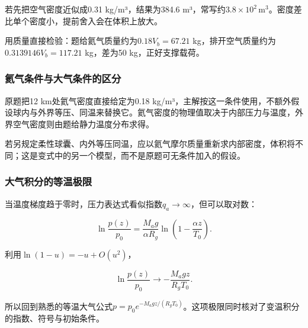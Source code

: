 \documentclass[12pt,a4paper,fontset=fandol]{ctexart}
\begin{document}
若先把空气密度近似成0.31 kg/m³，结果为384.6
m³，常写约\(3.8\times10^2\,\mathrm{m^3}\)。密度差比单个密度小，提前舍入会在体积上放大。

用质量直接检验：题给氦气质量约为\(0.18V_b=67.21\)
kg，排开空气质量约为\(0.3139146V_b=117.21\) kg，差为50
kg，正好支撑载荷。

\subsubsection{氦气条件与大气条件的区分}\label{ux6c26ux6c14ux6761ux4ef6ux4e0eux5927ux6c14ux6761ux4ef6ux7684ux533aux5206}

原题把12 km处氦气密度直接给定为0.18
kg/m³，主解按这一条件使用，不额外假设球内与外界等压、同温来替换它。氦气密度的物理值取决于内部压力与温度，外界空气密度则由题给静力温度分布求得。

若另规定柔性球囊、内外等压同温，应以氦气摩尔质量重新求内部密度，体积将不同；这是变式中的另一个模型，而不是原题可无条件加入的假设。

\par\noindent\begin{minipage}{\linewidth}
\subsubsection{大气积分的等温极限}\label{ux5927ux6c14ux79efux5206ux7684ux7b49ux6e29ux6781ux9650}

当温度梯度趋于零时，压力表达式看似指数\(q_a\to\infty\)，但可以取对数：

\[
\ln\frac{p(z)}{p_0}
=\frac{M_ag}{\alpha R_g}
\ln\left(1-\frac{\alpha z}{T_0}\right).
\]

利用\(\ln(1-u)=-u+O(u^2)\)，

\[
\ln\frac{p(z)}{p_0}\longrightarrow
-\frac{M_agz}{R_gT_0}.
\]

所以回到熟悉的等温大气公式\(p=p_0e^{-M_agz/(R_gT_0)}\)。这项极限同时核对了变温积分的指数、符号与初始条件。
\end{minipage}\par
\end{document}
